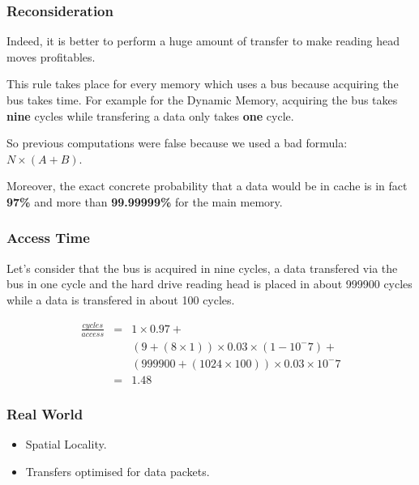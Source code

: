 
\begin{frame}
  \frametitle{Reconsideration}

  Indeed, it is better to perform a huge amount of transfer to make reading
  head moves profitables.

  \-

  This rule takes place for every memory which uses a bus because acquiring
  the bus takes time. For example for the Dynamic Memory, acquiring the
  bus takes \textbf{nine} cycles while transfering a data only takes
  \textbf{one} cycle.

  \-

  So previous computations were false because we used a bad formula:
  \textbf{$N \times (A + B)$}.

  \-

  Moreover, the exact concrete probability that a data would be in cache
  is in fact \textbf{97\%} and more than \textbf{99.99999\%} for the main
  memory.
\end{frame}


\begin{frame}
  \frametitle{Access Time}

  Let's consider that the bus is acquired in nine cycles, a data
  transfered via the bus in one cycle and the hard drive reading head is
  placed in about 999900 cycles while a data is transfered in about
  100 cycles.

  \-

  \begin{eqnarray*}
    \frac{cycles}{access} & = & 1 \times 0.97 + \\
                          &   & (9 + (8 \times 1)) \times 0.03 \times
                                (1 - 10^-7) + \\
                          &   & (999900 + (1024 \times 100)) \times
                                0.03 \times 10^-7 \\
                          & = & 1.48
  \end{eqnarray*}
\end{frame}


\begin{frame}
  \frametitle{Real World}

  \begin{center}
  \end{center}

  \begin{itemize}
    \item
      Spatial Locality.
    \item
      Transfers optimised for data packets.
  \end{itemize}
\end{frame}

